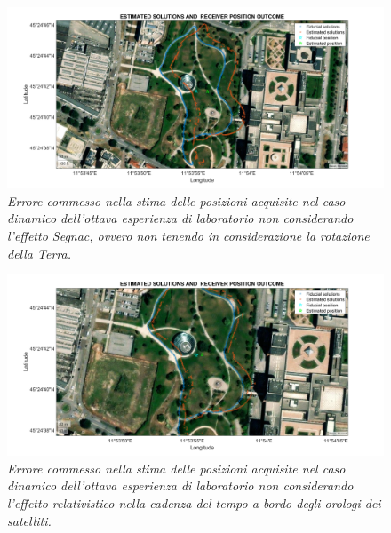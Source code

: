 \documentclass[a4paper,11pt,twoside]{book}
\begin{document}
	\begin{figure}[H]
		\centering
		\includegraphics[scale=0.30]{"Immagini workbook/Immagini esp8/err_segnac_8"}
		\caption{\textit{Errore commesso nella stima delle posizioni acquisite nel caso dinamico dell'ottava esperienza di laboratorio non considerando l'effetto Segnac, ovvero non tenendo in considerazione la rotazione della Terra.}}
		\label{fig:errsegnac8}
	\end{figure}
	
	\vspace{-1cm}
	
	\begin{figure}[H]
		\centering
		\includegraphics[scale=0.30]{"Immagini workbook/Immagini esp8/err_rel_8"}
		\caption{\textit{Errore commesso nella stima delle posizioni acquisite nel caso dinamico dell'ottava esperienza di laboratorio non considerando l'effetto relativistico nella cadenza del tempo a bordo degli orologi dei satelliti.}}
		\label{fig:errrel8}
	\end{figure}
	
	\vspace{-1cm}
	
\end{document}
